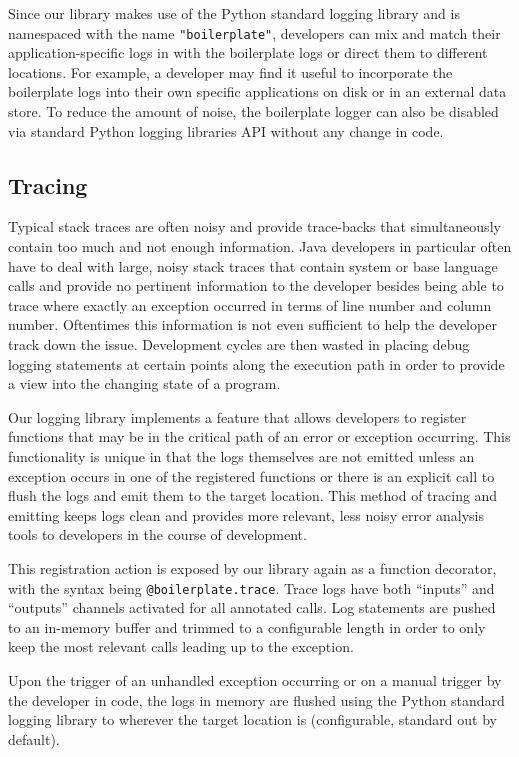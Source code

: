 \documentclass[acmsmall,review,authorversion]{acmart}
\newcommand{\code}[1]{\lstinline[basicstyle=\ttfamily\small]~#1~}
\begin{document}
Since our library makes use of the Python standard logging library and is namespaced with the name \code{"boilerplate"}, developers can mix and match their application-specific logs in with the boilerplate logs or direct them to different locations. For example, a developer may find it useful to incorporate the boilerplate logs into their own specific applications on disk or in an external data store. To reduce the amount of noise, the boilerplate logger can also be disabled via standard Python logging libraries API without any change in code.

\subsection{Tracing}

Typical stack traces are often noisy and provide trace-backs that simultaneously contain too much and not enough information. Java developers in particular often have to deal with large, noisy stack traces that contain system or base language calls and provide no pertinent information to the developer besides being able to trace where exactly an exception occurred in terms of line number and column number. Oftentimes this information is not even sufficient to help the developer track down the issue. Development cycles are then wasted in placing debug logging statements at certain points along the execution path in order to provide a view into the changing state of a program.

Our logging library implements a feature that allows developers to register functions that may be in the critical path of an error or exception occurring. This functionality is unique in that the logs themselves are not emitted unless an exception occurs in one of the registered functions or there is an explicit call to flush the logs and emit them to the target location. This method of tracing and emitting keeps logs clean and provides more relevant, less noisy error analysis tools to developers in the course of development.

This registration action is exposed by our library again as a function decorator, with the syntax being \code{@boilerplate.trace}. Trace logs have both ``inputs'' and ``outputs'' channels activated for all annotated calls. Log statements are pushed to an in-memory buffer and trimmed to a configurable length in order to only keep the most relevant calls leading up to the exception.

Upon the trigger of an unhandled exception occurring or on a manual trigger by the developer in code, the logs in memory are flushed using the Python standard logging library to wherever the target location is (configurable, standard out by default).
\end{document}
